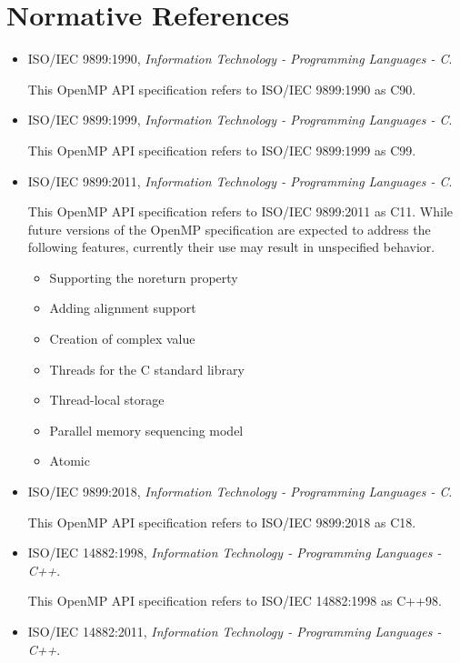 \section{Normative References}
\label{sec:normative references}
\begin{itemize}
\item ISO/IEC 9899:1990, \textsl{Information Technology - Programming Languages - C}.

This OpenMP API specification refers to ISO/IEC 9899:1990 as C90.

\item ISO/IEC 9899:1999, \textsl{Information Technology - Programming Languages - C}.

This OpenMP API specification refers to ISO/IEC 9899:1999 as C99.

\item ISO/IEC 9899:2011, \textsl{Information Technology - Programming Languages - C}.

This OpenMP API specification refers to ISO/IEC 9899:2011 as C11.
While future versions of the OpenMP specification are expected to 
address the following features, currently their use may result in 
unspecified behavior.

\begin{itemize}
\item Supporting the noreturn property
\item Adding alignment support
\item Creation of complex value
\item Threads for the C standard library
\item Thread-local storage
\item Parallel memory sequencing model
\item Atomic
\end{itemize}

\item ISO/IEC 9899:2018, \textsl{Information Technology - Programming Languages - C}.

This OpenMP API specification refers to ISO/IEC 9899:2018 as C18.

\item ISO/IEC 14882:1998, \textsl{Information Technology - Programming Languages - C++}.

This OpenMP API specification refers to ISO/IEC 14882:1998 as C++98.

\item ISO/IEC 14882:2011, \textsl{Information Technology - Programming Languages - C++}.


\end{itemize}
